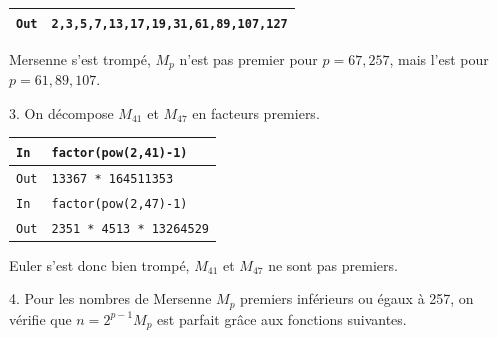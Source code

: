 \documentclass[titlepage]{article}
\begin{document}
    

    \begin{tabularx}{12cm}{|p{0.60cm}|X|}
        \hline
        \texttt{Out}
        &
        \texttt{2,3,5,7,13,17,19,31,61,89,107,127}
        \\
        \hline
    \end{tabularx}
    \bigbreak

    Mersenne s'est trompé, $M_p$ n'est pas premier pour $p = 67, 257$, mais l'est pour $p = 61, 89, 107$.\bigbreak

    3. On décompose $M_{41}$ et $M_{47}$ en facteurs premiers.\bigbreak

    \begin{tabularx}{12cm}{|p{0.60cm}|X|}
        \hline
        \rowcolor{gray}
        \texttt{In}
        & 
        \texttt{factor(pow(2,41)-1)}
        \\
        \hline
        \texttt{Out}
        &
        \texttt{13367 * 164511353}
        \\
        \hline
        \rowcolor{gray}
        \texttt{In}
        & 
        \texttt{factor(pow(2,47)-1)}
        \\
        \hline
        \texttt{Out}
        &
        \texttt{2351 * 4513 * 13264529}
        \\
        \hline
    \end{tabularx}
    \bigbreak

    Euler s'est donc bien trompé, $M_{41}$ et $M_{47}$ ne sont pas premiers.\bigbreak

    4. Pour les nombres de Mersenne $M_p$ premiers inférieurs ou égaux à 257, on vérifie que $n = 2^{p-1}M_p$ est parfait grâce aux fonctions suivantes.
    
\end{document}
